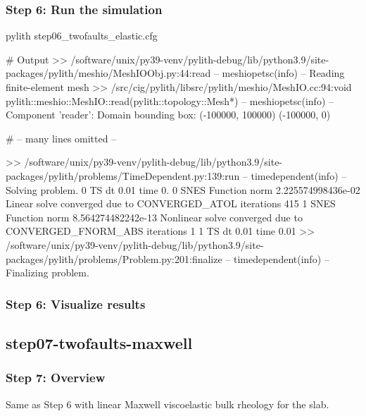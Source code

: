 \documentclass[aspectratio=169]{beamer}
\begin{document}
\begin{frame}[fragile]
  \frametitle{Step 6: Run the simulation}
  \summary{}

\begin{bashcode}
pylith step06_twofaults_elastic.cfg

# Output
 >> /software/unix/py39-venv/pylith-debug/lib/python3.9/site-packages/pylith/meshio/MeshIOObj.py:44:read
 -- meshiopetsc(info)
 -- Reading finite-element mesh
 >> /src/cig/pylith/libsrc/pylith/meshio/MeshIO.cc:94:void pylith::meshio::MeshIO::read(pylith::topology::Mesh*)
 -- meshiopetsc(info)
 -- Component 'reader': Domain bounding box:
    (-100000, 100000)
    (-100000, 0)

# -- many lines omitted --

 >> /software/unix/py39-venv/pylith-debug/lib/python3.9/site-packages/pylith/problems/TimeDependent.py:139:run
 -- timedependent(info)
 -- Solving problem.
0 TS dt 0.01 time 0.
    0 SNES Function norm 2.225574998436e-02
    Linear solve converged due to CONVERGED_ATOL iterations 415
    1 SNES Function norm 8.564274482242e-13
  Nonlinear solve converged due to CONVERGED_FNORM_ABS iterations 1
1 TS dt 0.01 time 0.01
 >> /software/unix/py39-venv/pylith-debug/lib/python3.9/site-packages/pylith/problems/Problem.py:201:finalize
 -- timedependent(info)
 -- Finalizing problem.
\end{bashcode}
  
\end{frame}


\begin{frame}
  \frametitle{Step 6: Visualize results}

    
\end{frame}


\subsection{step07-twofaults-maxwell}

\begin{frame}
  \frametitle{Step 7: Overview}

  Same as Step 6 with linear Maxwell viscoelastic bulk rheology for the slab.
      
\end{frame}
\end{document}
